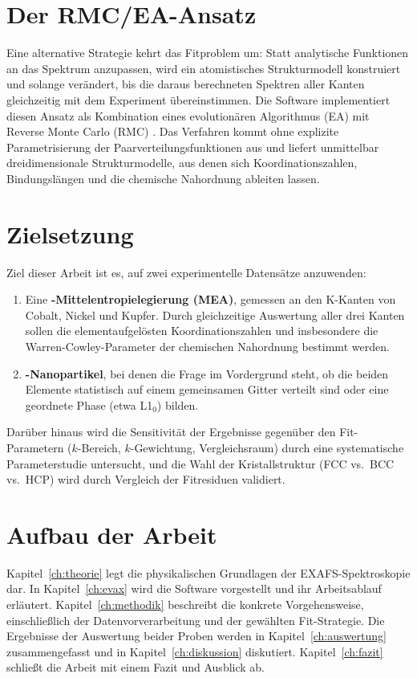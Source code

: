 \section{Der RMC/EA-Ansatz}

Eine alternative Strategie kehrt das Fitproblem um:
Statt analytische Funktionen an das Spektrum anzupassen, wird ein
atomistisches Strukturmodell konstruiert und solange verändert, bis die
daraus berechneten Spektren aller Kanten gleichzeitig mit dem Experiment
übereinstimmen.
Die Software \evax{} implementiert diesen Ansatz als Kombination eines
evolutionären Algorithmus (EA) mit Reverse Monte Carlo (RMC)
\cite{Timoshenko2009, Timoshenko2012a, Timoshenko2014}.
Das Verfahren kommt ohne explizite Parametrisierung der
Paarverteilungsfunktionen aus und liefert unmittelbar
dreidimensionale Strukturmodelle, aus denen sich Koordinationszahlen,
Bindungslängen und die chemische Nahordnung ableiten lassen.

\section{Zielsetzung}

Ziel dieser Arbeit ist es, \evax{} auf zwei experimentelle Datensätze
anzuwenden:

\begin{enumerate}[label=(\roman*)]
  \item Eine \textbf{-Mittelentropielegierung (MEA)}, gemessen
        an den K-Kanten von Cobalt, Nickel und Kupfer.
        Durch gleichzeitige Auswertung aller drei Kanten sollen die
        elementaufgelösten Koordinationszahlen und insbesondere die
        Warren-Cowley-Parameter der chemischen Nahordnung bestimmt werden.
  \item \textbf{-Nanopartikel}, bei denen die Frage im
        Vordergrund steht, ob die beiden Elemente statistisch auf
        einem gemeinsamen Gitter verteilt sind oder eine geordnete
        Phase (etwa L1$_0$) bilden.
\end{enumerate}

Darüber hinaus wird die Sensitivität der Ergebnisse gegenüber den
Fit-Parametern ($k$-Bereich, $k$-Gewichtung, Vergleichsraum) durch
eine systematische Parameterstudie untersucht, und die Wahl der
Kristallstruktur (FCC vs.\ BCC vs.\ HCP) wird durch Vergleich der
Fitresiduen validiert.

\section{Aufbau der Arbeit}

Kapitel~\ref{ch:theorie} legt die physikalischen Grundlagen der
EXAFS-Spektroskopie dar.
In Kapitel~\ref{ch:evax} wird die Software \evax{} vorgestellt und ihr
Arbeitsablauf erläutert.
Kapitel~\ref{ch:methodik} beschreibt die konkrete Vorgehensweise,
einschließlich der Datenvorverarbeitung und der gewählten Fit-Strategie.
Die Ergebnisse der Auswertung beider Proben werden in
Kapitel~\ref{ch:auswertung} zusammengefasst und in
Kapitel~\ref{ch:diskussion} diskutiert.
Kapitel~\ref{ch:fazit} schließt die Arbeit mit einem Fazit und Ausblick ab.
